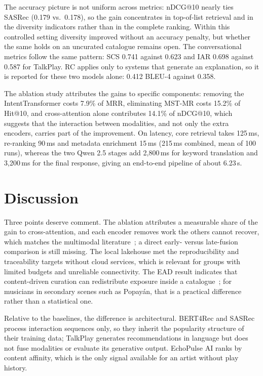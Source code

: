 \documentclass[]{ceurart}
\begin{document}
The accuracy picture is not uniform across metrics: nDCG@10 nearly ties SASRec
(0.179 vs.\ 0.178), so the gain concentrates in top-of-list retrieval and in the
diversity indicators rather than in the complete ranking. Within this controlled
setting diversity improved without an accuracy penalty, but whether the same
holds on an uncurated catalogue remains open. The conversational metrics follow
the same pattern: SCS 0.741 against 0.623 and IAR 0.698 against 0.587 for
TalkPlay. RC applies only to systems that generate an explanation, so it is
reported for these two models alone: 0.412 BLEU-4 against 0.358.

The ablation study attributes the gains to specific components: removing the
IntentTransformer costs 7.9\% of MRR, eliminating MST-MR costs 15.2\% of Hit@10,
and cross-attention alone contributes 14.1\% of nDCG@10, which suggests that the
interaction between modalities, and not only the extra encoders, carries part of
the improvement. On latency, core retrieval takes 125\,ms,
re-ranking 90\,ms and metadata enrichment 15\,ms (215\,ms combined, mean of 100
runs), whereas the two Qwen 2.5 stages add 2,800\,ms for keyword translation and
3,200\,ms for the final response, giving an end-to-end pipeline of about 6.23\,s.

\section{Discussion}
\label{sec:discussion}

Three points deserve comment. The ablation attributes a measurable share of the
gain to cross-attention, and each encoder removes work the others cannot
recover, which matches the multimodal literature~\cite{baltruvsaitis2019multimodal};
a direct early- versus late-fusion comparison is still missing. The local
lakehouse met the reproducibility and traceability targets without cloud
services, which is relevant for groups with limited budgets and unreliable
connectivity. The EAD result indicates that content-driven curation can
redistribute exposure inside a catalogue~\cite{brynjolfsson2011long}; for
musicians in secondary scenes such as Popayán, that is a practical difference
rather than a statistical one.

Relative to the baselines, the difference is architectural. BERT4Rec and SASRec
process interaction sequences only, so they inherit the popularity structure of
their training data; TalkPlay generates recommendations in language but does not
fuse modalities or evaluate its generative output. EchoPulse AI ranks by content
affinity, which is the only signal available for an artist without play history.
\end{document}
